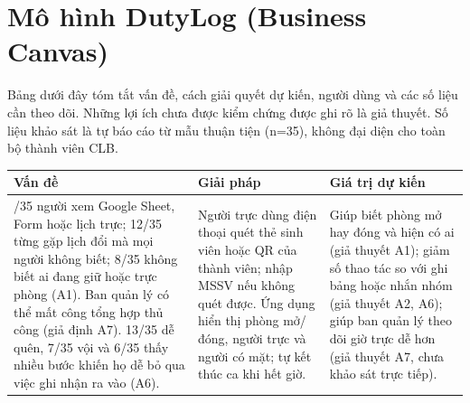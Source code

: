 \section{Mô hình DutyLog (Business Canvas)}

Bảng dưới đây tóm tắt vấn đề, cách giải quyết dự kiến, người dùng và các số liệu cần theo dõi. Những lợi ích chưa được kiểm chứng được ghi rõ là giả thuyết. Số liệu khảo sát là tự báo cáo từ mẫu thuận tiện (n=35), không đại diện cho toàn bộ thành viên CLB.

\setlength{\tabcolsep}{4pt}
\begingroup
\small
\renewcommand{\arraystretch}{1.05}
\captionsetup{hypcap=false}
\label{tab:business_canvas}\par
\begin{tabular}{|>{\raggedright\arraybackslash}p{}|>{\raggedright\arraybackslash}p{}|>{\raggedright\arraybackslash}p{}|}
\hline
\textbf{Vấn đề} & \textbf{Giải pháp} & \textbf{Giá trị dự kiến} \\
\hline
21/35 người xem Google Sheet, Form hoặc lịch trực; 12/35 từng gặp lịch đổi mà mọi người không biết; 8/35 không biết ai đang giữ hoặc trực phòng (A1). Ban quản lý có thể mất công tổng hợp thủ công (giả định A7). 13/35 dễ quên, 7/35 vội và 6/35 thấy nhiều bước khiến họ dễ bỏ qua việc ghi nhận ra vào (A6). &
Người trực dùng điện thoại quét thẻ sinh viên hoặc QR của thành viên; nhập MSSV nếu không quét được. Ứng dụng hiển thị phòng mở/đóng, người trực và người có mặt; tự kết thúc ca khi hết giờ. &
Giúp biết phòng mở hay đóng và hiện có ai (giả thuyết A1); giảm số thao tác so với ghi bảng hoặc nhắn nhóm (giả thuyết A2, A6); giúp ban quản lý theo dõi giờ trực dễ hơn (giả thuyết A7, chưa khảo sát trực tiếp). \\
\hline
\end{tabular}
\par\medskip
